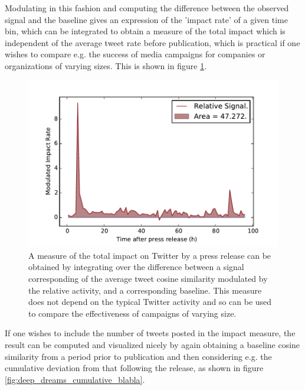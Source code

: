 Modulating in this fashion and computing the difference between the observed signal and the baseline gives an expression of the 'impact rate' of a given time bin, which can be integrated to obtain a measure of the total impact which is independent of the average tweet rate before publication, which is practical if one wishes to compare e.g. the success of media campaigns for companies or organizations of varying sizes. This is shown in figure \ref{fig:total_impact_integral_thingy}.
\begin{figure} %
	\centering
	\includegraphics[width=\figwidth]{pics/esa/deep_dreams_modulated_integration.pdf}
	\caption{A measure of the total impact on Twitter by a press release can be obtained by integrating over the difference between a signal corresponding of the average tweet cosine similarity modulated by the relative activity, and a corresponding baseline. This measure does not depend on the typical Twitter activity and so can be used to compare the effectiveness of campaigns of varying size.}
	\label{fig:total_impact_integral_thingy}
\end{figure}
If one wishes to include the number of tweets posted in the impact measure, the result can be computed and visualized nicely by again obtaining a baseline cosine similarity from a period prior to publication and then considering e.g. the cumulative deviation from that following the release, as shown in figure \ref{fig:deep_dreams_cumulative_blabla}.
